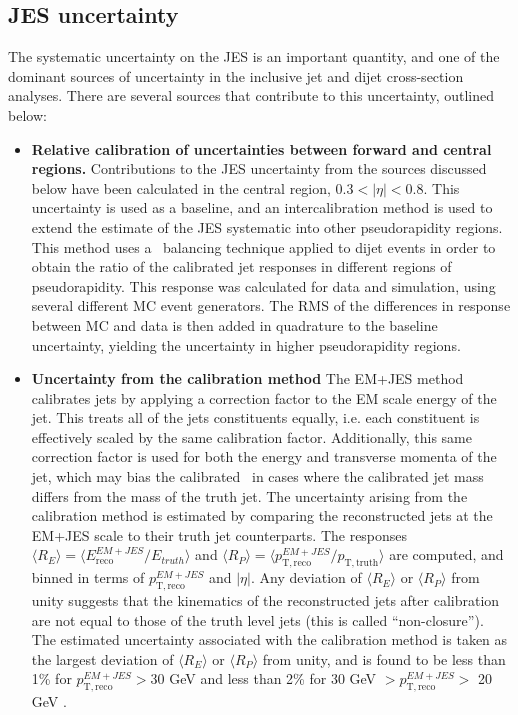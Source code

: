 \subsection{JES uncertainty}
\label{JES_uncertainty_section}
The systematic uncertainty on the JES is an important quantity, and one of the dominant sources of uncertainty in the inclusive jet and dijet cross-section analyses. There are several sources that contribute to this uncertainty, outlined below:

\begin{itemize}
\item{\bf Relative calibration of uncertainties between forward and central regions.} Contributions to the JES uncertainty from the sources discussed below have been calculated in the central region, $0.3 < |\eta | < 0.8$. This uncertainty is used as a baseline, and an intercalibration method \cite{ATLAS-CONF-2011-014} is used to extend the estimate of the JES systematic into other pseudorapidity regions. This method uses a \pt~balancing technique applied to dijet events in order to obtain the ratio of the calibrated jet responses in different regions of pseudorapidity. This response was calculated for data and simulation, using several different MC event generators. The RMS of the differences in response between MC and data is then added in quadrature to the baseline uncertainty, yielding the uncertainty in higher pseudorapidity regions.
\item{\bf Uncertainty from the calibration method} The EM+JES method calibrates jets by applying a correction factor to the EM scale energy of the jet. This treats all of the jets constituents equally, i.e. each constituent is effectively scaled by the same calibration factor. Additionally, this same correction factor is used for both the energy and transverse momenta of the jet, which may bias the calibrated \pt~in cases where the calibrated jet mass differs from the mass of the truth jet. The uncertainty arising from the calibration method is estimated by comparing the reconstructed jets at the EM+JES scale to their truth jet counterparts. The responses $\langle R_E \rangle = \langle E_\mathrm{reco}^{EM+JES} / E_{truth} \rangle$ and $\langle R_P \rangle = \langle p_\mathrm{T,reco}^{EM+JES} / p_\mathrm{T,truth} \rangle$ are computed, and binned in terms of $p_\mathrm{T,reco}^{EM+JES}$ and $|\eta|$. Any deviation of $\langle R_E \rangle$ or $\langle R_P \rangle$ from unity suggests that the kinematics of the reconstructed jets after calibration are not equal to those of the truth level jets (this is called ``non-closure''). The estimated uncertainty associated with the calibration method is taken as the largest deviation of $\langle R_E \rangle$ or $\langle R_P \rangle$ from unity, and is found to be less than 1\% for $p_\mathrm{T,reco}^{EM+JES} > 30$ GeV and less than 2\% for 30 GeV $> p_\mathrm{T,reco}^{EM+JES} >$ 20 GeV \cite{ATLAS_JES_2010}.


\end{itemize}
